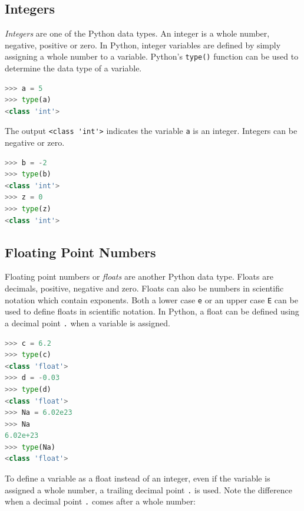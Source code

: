 \documentclass{book}
\begin{document}
    
        \subsection{Integers}\label{integers}

\emph{Integers} are one of the Python data types. An integer is a whole
number, negative, positive or zero. In Python, integer variables are
defined by simply assigning a whole number to a variable. Python's
\lstinline!type()! function can be used to determine the data type of a
variable.

\begin{lstlisting}[language=Python]
>>> a = 5
>>> type(a)
<class 'int'>
\end{lstlisting}

The output \lstinline!<class 'int'>! indicates the variable
\lstinline!a! is an integer. Integers can be negative or zero.

\begin{lstlisting}[language=Python]
>>> b = -2
>>> type(b)
<class 'int'>
>>> z = 0
>>> type(z)
<class 'int'>
\end{lstlisting}
    




    
        \subsection{Floating Point Numbers}\label{floating-point-numbers}

Floating point numbers or \emph{floats} are another Python data type.
Floats are decimals, positive, negative and zero. Floats can also be
numbers in scientific notation which contain exponents. Both a lower
case \lstinline!e! or an upper case \lstinline!E! can be used to define
floats in scientific notation. In Python, a float can be defined using a
decimal point \lstinline!.! when a variable is assigned.

\begin{lstlisting}[language=Python]
>>> c = 6.2
>>> type(c)
<class 'float'>
>>> d = -0.03
>>> type(d)
<class 'float'>
>>> Na = 6.02e23
>>> Na
6.02e+23
>>> type(Na)
<class 'float'>
\end{lstlisting}

To define a variable as a float instead of an integer, even if the
variable is assigned a whole number, a trailing decimal point
\lstinline!.! is used. Note the difference when a decimal point
\lstinline!.! comes after a whole number:
\end{document}
